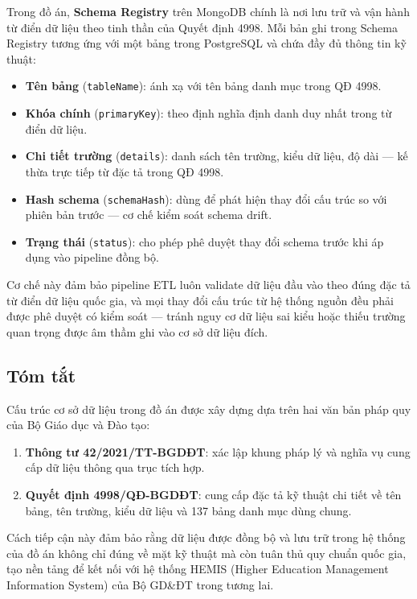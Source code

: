 Trong đồ án, \textbf{Schema Registry} trên MongoDB chính là nơi lưu trữ và vận hành từ điển dữ liệu theo tinh thần của Quyết định 4998. Mỗi bản ghi trong Schema Registry tương ứng với một bảng trong PostgreSQL và chứa đầy đủ thông tin kỹ thuật:

\begin{itemize}
    \item \textbf{Tên bảng} (\texttt{tableName}): ánh xạ với tên bảng danh mục trong QĐ 4998.
    \item \textbf{Khóa chính} (\texttt{primaryKey}): theo định nghĩa định danh duy nhất trong từ điển dữ liệu.
    \item \textbf{Chi tiết trường} (\texttt{details}): danh sách tên trường, kiểu dữ liệu, độ dài — kế thừa trực tiếp từ đặc tả trong QĐ 4998.
    \item \textbf{Hash schema} (\texttt{schemaHash}): dùng để phát hiện thay đổi cấu trúc so với phiên bản trước — cơ chế kiểm soát schema drift.
    \item \textbf{Trạng thái} (\texttt{status}): cho phép phê duyệt thay đổi schema trước khi áp dụng vào pipeline đồng bộ.
\end{itemize}

Cơ chế này đảm bảo pipeline ETL luôn validate dữ liệu đầu vào theo đúng đặc tả từ điển dữ liệu quốc gia, và mọi thay đổi cấu trúc từ hệ thống nguồn đều phải được phê duyệt có kiểm soát — tránh nguy cơ dữ liệu sai kiểu hoặc thiếu trường quan trọng được âm thầm ghi vào cơ sở dữ liệu đích.

\subsection{Tóm tắt}

Cấu trúc cơ sở dữ liệu trong đồ án được xây dựng dựa trên hai văn bản pháp quy của Bộ Giáo dục và Đào tạo:

\begin{enumerate}
    \item \textbf{Thông tư 42/2021/TT-BGDĐT}: xác lập khung pháp lý và nghĩa vụ cung cấp dữ liệu thông qua trục tích hợp.
    \item \textbf{Quyết định 4998/QĐ-BGDĐT}: cung cấp đặc tả kỹ thuật chi tiết về tên bảng, tên trường, kiểu dữ liệu và 137 bảng danh mục dùng chung.
\end{enumerate}

Cách tiếp cận này đảm bảo rằng dữ liệu được đồng bộ và lưu trữ trong hệ thống của đồ án không chỉ đúng về mặt kỹ thuật mà còn tuân thủ quy chuẩn quốc gia, tạo nền tảng để kết nối với hệ thống HEMIS (Higher Education Management Information System) của Bộ GD\&ĐT trong tương lai.
